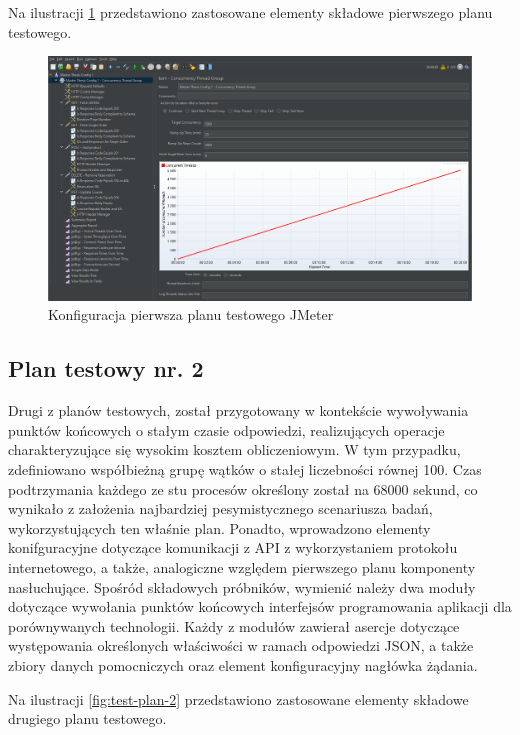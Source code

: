 Na ilustracji \ref{fig:test-plan-1} przedstawiono zastosowane elementy składowe pierwszego planu testowego.

\begin{figure}[ht]
    \centering
     \includegraphics[width=\linewidth]{rys04/test-plan-1.png}
    \caption{Konfiguracja pierwsza planu testowego JMeter}
    \label{fig:test-plan-1}
\end{figure}

\subsection*{Plan testowy nr. 2}
\label{plan-testowy-2}
Drugi z planów testowych, został przygotowany w kontekście wywoływania punktów końcowych o stałym czasie odpowiedzi, realizujących operacje charakteryzujące się wysokim kosztem obliczeniowym. W tym przypadku, zdefiniowano współbieżną grupę wątków o stałej liczebności równej 100. Czas podtrzymania każdego ze stu procesów określony został na 68000 sekund, co wynikało z założenia najbardziej pesymistycznego scenariusza badań, wykorzystujących ten właśnie plan. Ponadto, wprowadzono elementy konifguracyjne dotyczące komunikacji z API z wykorzystaniem protokołu internetowego, a także, analogiczne względem pierwszego planu komponenty nasłuchujące. Spośród składowych próbników, wymienić należy dwa moduły dotyczące wywołania punktów końcowych interfejsów programowania aplikacji dla porównywanych technologii. Każdy z modułów zawierał asercje dotyczące występowania określonych właściwości w ramach odpowiedzi JSON, a także zbiory danych pomocniczych oraz element konfiguracyjny nagłówka żądania.  

Na ilustracji \ref{fig:test-plan-2} przedstawiono zastosowane elementy składowe drugiego planu testowego.

